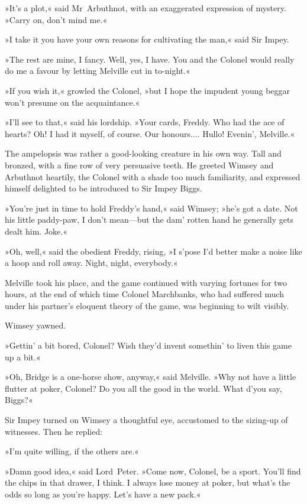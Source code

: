 »It's a plot,« said Mr~Arbuthnot, with an exaggerated expression of mystery. »Carry on, don't mind me.«

»I take it you have your own reasons for cultivating the man,« said Sir Impey.

»The rest are mine, I fancy. Well, yes, I have. You and the Colonel would really do me a favour by letting Melville cut in to-night.«

»If you wish it,« growled the Colonel, »but I hope the impudent young beggar won't presume on the acquaintance.«

»I'll see to that,« said his lordship. »Your cards, Freddy. Who had the ace of hearts? Oh! I had it myself, of course. Our honours.... Hullo! Evenin', Melville.«

The ampelopsis was rather a good-looking creature in his own way. Tall and bronzed, with a fine row of very persuasive teeth. He greeted Wimsey and Arbuthnot heartily, the Colonel with a shade too much familiarity, and expressed himself delighted to be introduced to Sir Impey Biggs.

»You're just in time to hold Freddy's hand,« said Wimsey; »he's got a date. Not his little paddy-paw, I don't mean—but the dam' rotten hand he generally gets dealt him. Joke.«

»Oh, well,« said the obedient Freddy, rising, »I s'pose I'd better make a noise like a hoop and roll away. Night, night, everybody.«

Melville took his place, and the game continued with varying fortunes for two hours, at the end of which time Colonel Marchbanks, who had suffered much under his partner's eloquent theory of the game, was beginning to wilt visibly.

Wimsey yawned.

»Gettin' a bit bored, Colonel? Wish they'd invent somethin' to liven this game up a bit.«

»Oh, Bridge is a one-horse show, anyway,« said Melville. »Why not have a little flutter at poker, Colonel? Do you all the good in the world. What d'you say, Biggs?«

Sir Impey turned on Wimsey a thoughtful eye, accustomed to the sizing-up of witnesses. Then he replied:

»I'm quite willing, if the others are.«

»Damn good idea,« said Lord~Peter. »Come now, Colonel, be a sport. You'll find the chips in that drawer, I think. I always lose money at poker, but what's the odds so long as you're happy. Let's have a new pack.«

